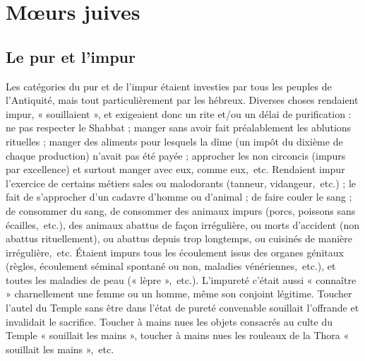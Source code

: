 

\chapter{Mœurs juives}

\section{Le pur et l'impur}

 Les catégories du pur et de l'impur étaient investies par tous les peuples de l'Antiquité, mais tout particulièrement par les hébreux. Diverses choses rendaient impur, « souillaient », et exigeaient donc un rite et/ou un délai de purification : ne pas respecter le Shabbat ; manger sans avoir fait préalablement les ablutions rituelles ; manger des aliments pour lesquels la dîme (un impôt du dixième de chaque production) n'avait pas été payée ; approcher les non circoncis (impurs par excellence) et surtout manger avec eux, comme eux,~etc. Rendaient impur l'exercice de certains métiers sales ou malodorants (tanneur, vidangeur,~etc.) ; le fait de s'approcher d'un cadavre d'homme ou d'animal ; de faire couler le sang ; de consommer du sang, de consommer des animaux impurs (porcs, poissons sans écailles,~etc.), des animaux abattus de façon irrégulière, ou morts d'accident (non abattus rituellement), ou abattus depuis trop longtemps, ou cuisinés de manière irrégulière,~etc. Étaient impurs tous les écoulement issus des organes génitaux (règles, écoulement séminal spontané ou non, maladies vénériennes,~etc.), et toutes les maladies de peau (« lèpre »,~etc.). L'impureté c'était aussi « connaître » charnellement une femme ou un homme, même son conjoint légitime. Toucher l'autel du Temple sans être dans l'état de pureté convenable souillait l'offrande et invalidait le sacrifice. Toucher à mains nues les objets consacrés au culte du Temple « souillait les mains », toucher à mains nues les rouleaux de la Thora « souillait les mains »,~etc.

